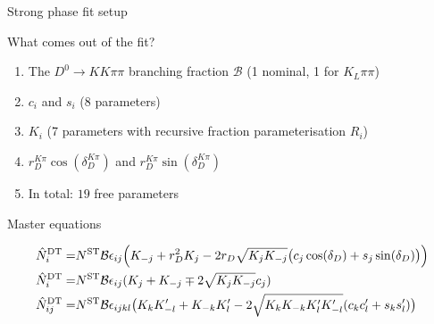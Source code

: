 \documentclass{beamer}
\begin{document}
\begin{frame}{Strong phase fit setup}
  \begin{center}
    \Large{What comes out of the fit?}
  \end{center}
  \vspace{0.2cm}
  \begin{enumerate}
    \item{The $D^0\to KK\pi\pi$ branching fraction $\mathcal{B}$ (1 nominal, 1 for $K_L\pi\pi$)}
    \item{$c_i$ and $s_i$ (8 parameters)}
    \item{$K_i$ (7 parameters with recursive fraction parameterisation $R_i$)}
    \item{$r_D^{K\pi}\cos(\delta_D^{K\pi})$ and $r_D^{K\pi}\sin(\delta_D^{K\pi})$}
    \item{In total: $19$ free parameters}
  \end{enumerate}
  \begin{block}{Master equations}
    \begin{center}
      \vspace{-0.5cm}
      \begin{align*}
        \hat{N}^{\rm DT}_i =& N^{\rm ST}\mathcal{B}\epsilon_{ij}\Big(K_{-j} + r_D^2K_j - 2r_D\sqrt{K_jK_{-j}}\big(c_j\cos(\delta_D) + s_j\sin(\delta_D)\big)\Big) \\
        \hat{N}^{\rm DT}_i =& N^{\rm ST}\mathcal{B}\epsilon_{ij}(K_j + K_{-j} \mp 2\sqrt{K_jK_{-j}}c_j) \\
        \hat{N}^{\rm DT}_{ij} =& N^{\rm ST}\mathcal{B}\epsilon_{ijkl}\big(K_{k}K_{-l}^\prime + K_{-k}K_{l}^\prime - 2\sqrt{K_{k}K_{-k}K_{l}^\prime K_{-l}^\prime}(c_{k}c_{l}^\prime + s_{k}s_{l}^\prime)\big)
      \end{align*}
    \end{center}
  \end{block}
\end{frame}
\end{document}
